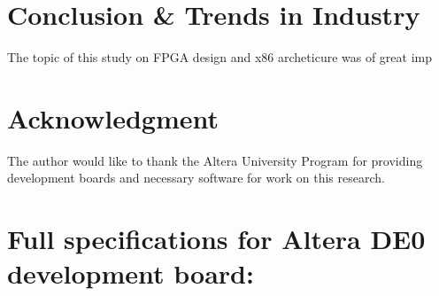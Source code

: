 \documentclass[11pt,peerreviewca]{IEEEtran}
\begin{document}
\section{Conclusion \& Trends in Industry}
The topic of this study on FPGA design and x86 archeticure was of great imp

\section*{Acknowledgment}
The author would like to thank the Altera University Program \cite{UniProgram} for providing development boards and necessary software for work on this research.

\appendices
\label{App:AppendixA}
\section{Full specifications for Altera DE0 development board:}
\end{document}
